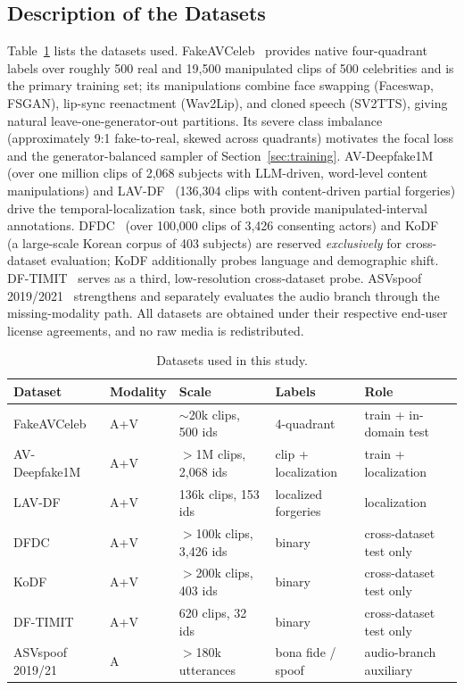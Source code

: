 \subsection{Description of the Datasets}
Table~\ref{tab:datasets} lists the datasets used.
FakeAVCeleb~\cite{khalid2021fakeavceleb} provides native four-quadrant labels
over roughly 500 real and 19{,}500 manipulated clips of 500 celebrities and
is the primary training set; its manipulations combine face swapping
(Faceswap, FSGAN), lip-sync reenactment (Wav2Lip), and cloned speech
(SV2TTS), giving natural leave-one-generator-out partitions. Its severe class
imbalance (approximately 9:1 fake-to-real, skewed across quadrants) motivates
the focal loss and the generator-balanced sampler of
Section~\ref{sec:training}. AV-Deepfake1M~\cite{cai2023avdeepfake1m}
(over one million clips of 2{,}068 subjects with LLM-driven, word-level
content manipulations) and LAV-DF~\cite{cai2022lavdf} (136{,}304 clips with
content-driven partial forgeries) drive the temporal-localization task, since
both provide manipulated-interval annotations.
DFDC~\cite{dolhansky2020dfdc} (over 100{,}000 clips of 3{,}426 consenting
actors) and KoDF~\cite{kwon2021kodf} (a large-scale Korean corpus of 403
subjects) are reserved \emph{exclusively} for cross-dataset evaluation; KoDF
additionally probes language and demographic shift.
DF-TIMIT~\cite{korshunov2018dftimit} serves as a third, low-resolution
cross-dataset probe. ASVspoof 2019/2021~\cite{wang2020asvspoof} strengthens
and separately evaluates the audio branch through the missing-modality path.
All datasets are obtained under their respective end-user license
agreements, and no raw media is redistributed.

\begin{table}[htbp]
\centering
\caption{Datasets used in this study.}
\label{tab:datasets}
\small
\begin{tabular}{lllll}
\toprule
\textbf{Dataset} & \textbf{Modality} & \textbf{Scale} & \textbf{Labels} & \textbf{Role} \\
\midrule
FakeAVCeleb   & A+V & $\sim$20k clips, 500 ids & 4-quadrant           & train + in-domain test \\
AV-Deepfake1M & A+V & $>$1M clips, 2{,}068 ids & clip + localization   & train + localization \\
LAV-DF        & A+V & 136k clips, 153 ids & localized forgeries   & localization \\
DFDC          & A+V & $>$100k clips, 3{,}426 ids & binary                & cross-dataset test only \\
KoDF          & A+V & $>$200k clips, 403 ids & binary                & cross-dataset test only \\
DF-TIMIT      & A+V & 620 clips, 32 ids & binary                & cross-dataset test only \\
ASVspoof 2019/21 & A & $>$180k utterances & bona fide / spoof    & audio-branch auxiliary \\
\bottomrule
\end{tabular}
\end{table}

